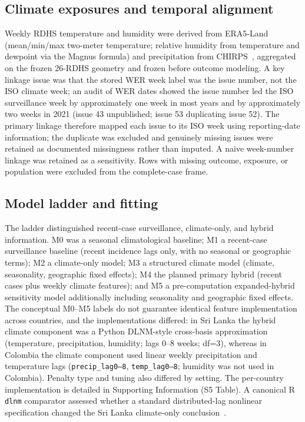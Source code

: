 \documentclass[11pt,a4paper]{article}
\begin{document}
\subsection{Climate exposures and temporal alignment}
Weekly RDHS temperature and humidity were derived from ERA5-Land~\cite{MunozSabater2021,ERA5LandCDS} (mean/min/max two-meter temperature; relative humidity from temperature and dewpoint via the Magnus formula) and precipitation from CHIRPS~\cite{Funk2015,CHIRPS}, aggregated on the frozen 26-RDHS geometry and frozen before outcome modeling. A key linkage issue was that the stored WER week label was the issue number, not the ISO climate week; an audit of WER dates showed the issue number led the ISO surveillance week by approximately one week in most years and by approximately two weeks in 2021 (issue 43 unpublished; issue 53 duplicating issue 52). The primary linkage therefore mapped each issue to its ISO week using reporting-date information; the duplicate was excluded and genuinely missing issues were retained as documented missingness rather than imputed. A naive week-number linkage was retained as a sensitivity. Rows with missing outcome, exposure, or population were excluded from the complete-case frame.

\subsection{Model ladder and fitting}
The ladder distinguished recent-case surveillance, climate-only, and hybrid information. M0 was a seasonal climatological baseline; M1 a recent-case surveillance baseline (recent incidence lags only, with no seasonal or geographic terms); M2 a climate-only model; M3 a structured climate model (climate, seasonality, geographic fixed effects); M4 the planned primary hybrid (recent cases plus weekly climate features); and M5 a pre-computation expanded-hybrid sensitivity model additionally including seasonality and geographic fixed effects. The conceptual M0--M5 labels do not guarantee identical feature implementation across countries, and the implementations differed: in Sri Lanka the hybrid climate component was a Python DLNM-style cross-basis approximation (temperature, precipitation, humidity; lags 0--8 weeks; df=3), whereas in Colombia the climate component used linear weekly precipitation and temperature lags (\texttt{precip\_lag0--8}, \texttt{temp\_lag0--8}; humidity was not used in Colombia). Penalty type and tuning also differed by setting. The per-country implementation is detailed in Supporting Information (S5 Table). A canonical R \texttt{dlnm} comparator assessed whether a standard distributed-lag nonlinear specification changed the Sri Lanka climate-only conclusion~\cite{Gasparrini2010,Gasparrini2011}.
\end{document}
